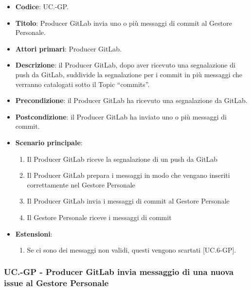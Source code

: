		\begin{itemize}
			\item \textbf{Codice}: UC\theuccount.\thesubuccount-GP.
			\item \textbf{Titolo}: Producer GitLab invia uno o più messaggi di commit al Gestore Personale.
			\item \textbf{Attori primari}: Producer GitLab.
			\item \textbf{Descrizione}: il Producer GitLab, dopo aver ricevuto una segnalazione di push da  \newline GitLab, suddivide la segnalazione per i commit in più messaggi che verranno catalogati sotto il Topic ``commits''.
			\item \textbf{Precondizione}: il Producer GitLab ha ricevuto una segnalazione da GitLab.
			\item \textbf{Postcondizione}: il Producer GitLab ha inviato uno o più messaggi di commit.
			\item \textbf{Scenario principale}:
			\begin{enumerate}
				\item Il Producer GitLab riceve la segnalazione di un push da GitLab
				\item Il Producer GitLab prepara i messaggi in modo che vengano inseriti correttamente nel Gestore Personale
				\item Il Producer GitLab invia i messaggi di
				commit al Gestore Personale
                \item Il Gestore Personale riceve i messaggi di commit
			\end{enumerate}
			\item \textbf{Estensioni}:
			\begin{enumerate}
				\item Se ci sono dei messaggi non validi, questi vengono scartati [UC\theuccount.6-GP].
			\end{enumerate}
		\end{itemize}


	\subsubsection{UC\theuccount.\thesubuccount-GP - Producer GitLab invia messaggio di una nuova issue al Gestore Personale}

